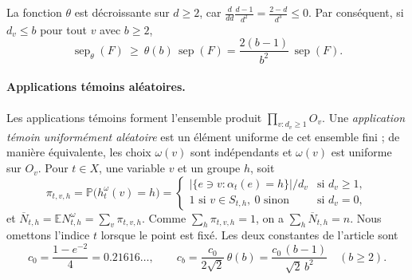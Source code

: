 \documentclass[11pt,a4paper]{article}
\theoremstyle{definition}
\theoremstyle{remark}
\newcommand{\E}{\mathbb{E}}
\newcommand{\PP}{\mathbb{P}}
\newcommand{\sep}{\operatorname{sep}}
\newcommand{\sepw}{\operatorname{sep}_{\theta}}
\newcommand{\Nbar}{\overline{N}}
\begin{document}
La fonction $\theta$ est décroissante sur $d\ge2$, car
$\frac{d}{dd}\frac{d-1}{d^2}=\frac{2-d}{d^3}\le0$. Par conséquent, si $d_v\le b$ pour tout
$v$ avec $b\ge2$,
\begin{equation}\label{eq:sepw}
\sepw(F)\ \ge\ \theta(b)\,\sep(F)=\frac{2(b-1)}{b^2}\,\sep(F).
\end{equation}

\paragraph{Applications témoins aléatoires.} Les applications témoins forment l'ensemble
produit $\prod_{v:d_v\ge1}O_v$. Une \emph{application témoin uniformément aléatoire} est un
élément uniforme de cet ensemble fini ; de manière équivalente, les choix $\omega(v)$ sont
indépendants et $\omega(v)$ est uniforme sur $O_v$. Pour $t\in X$, une variable $v$ et un
groupe $h$, soit
\[
\pi_{t,v,h}=\PP\bigl(h^\omega_t(v)=h\bigr)=
\begin{cases}
|\{e\ni v:\alpha_t(e)=h\}|/d_v&\text{si }d_v\ge1,\\
1\text{ si }v\in S_{t,h},\ 0\text{ sinon}&\text{si }d_v=0,
\end{cases}
\]
et $\Nbar_{t,h}=\E N^\omega_{t,h}=\sum_v\pi_{t,v,h}$. Comme $\sum_h\pi_{t,v,h}=1$, on a
$\sum_h\Nbar_{t,h}=n$. Nous omettons l'indice $t$ lorsque le point est fixé. Les deux
constantes de l'article sont
\[
c_0=\frac{1-e^{-2}}{4}=0.21616\ldots,\qquad
c_b=\frac{c_0}{2\sqrt2}\,\theta(b)=\frac{c_0\,(b-1)}{\sqrt2\,b^2}\quad(b\ge2).
\]
\end{document}
